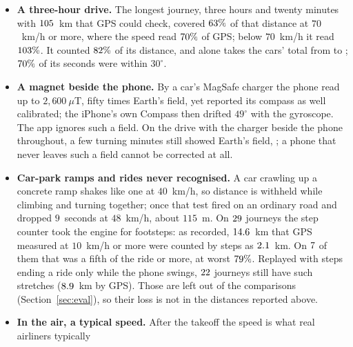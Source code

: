 \documentclass[11pt]{article}
\newcommand{\dg}{^\circ}
\begin{document}
\begin{itemize}
the $\nMagRecs$ recordings with the magnetometer logged, the minutes that passed the turn check put north
within $15\dg$ of the truth $\nTurnSampFifteen\%$ of the time (median error $\nTurnSampMed\dg$, worst $\nTurnSampWorst\dg$, $\nTurnSampN$ samples); the
steady-field seconds did so $\nCleanSampFifteen\%$ of the time (median $\nCleanSampMed\dg$, worst $\nCleanSampWorst\dg$, $\nCleanSampN$ samples).
Over those recordings' graded seconds the turn check moved the share within $30\dg$ from $\nMagPooledF\%$ to
$\nMagPooledG\%$. Matching the field's strength and dip to Earth's values instead was fragile
(Table~\ref{tab:failed}).
\item \textbf{A three-hour drive.} The longest journey, three hours and twenty minutes with $105$~km
that GPS could check, covered $63\%$ of that distance at $70$~km/h or more, where the speed read
$70\%$ of GPS; below $70$~km/h it read $103\%$. It counted $82\%$ of its distance, and alone
takes the cars' total from \nThreeHourCarWithout{} to \nCarDistTxt{}; $70\%$ of its seconds were within $30\dg$.
\item \textbf{A magnet beside the phone.} By a car's MagSafe charger the phone read up to
$2{,}600~\mu$T, fifty times Earth's field, yet reported its compass as well calibrated; the iPhone's own
Compass then drifted $49\dg$ with the gyroscope. The app ignores such a field. On the drive with the
charger beside the phone throughout, a few turning minutes still showed Earth's field,
\nMagSafeTxt{}; a phone that never leaves such a field cannot be
corrected at all.
\item \textbf{Car-park ramps and rides never recognised.} A car crawling up a concrete ramp shakes like
one at $40$~km/h, so distance is withheld while climbing and turning together; once that test fired on
an ordinary road and dropped $9$~seconds at $48$~km/h, about $115$~m. On $29$ journeys
the step counter took the engine for footsteps: as recorded, $14.6$~km that GPS measured at
$10$~km/h or more were counted by steps as $2.1$~km. On $7$ of them that was a fifth of the
ride or more, at worst $79\%$. Replayed with steps ending a ride only while the phone swings,
$22$ journeys still have such stretches ($8.9$~km by GPS). Those are left out of the
comparisons (Section~\ref{sec:eval}), so their loss is not in the distances reported above.
\item \textbf{In the air, a typical speed.} After the takeoff the speed is what real airliners typically

\end{itemize}
\end{document}
